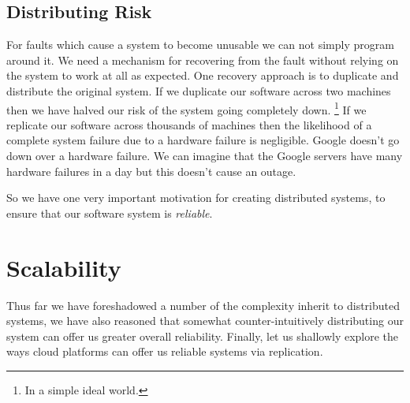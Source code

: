 \subsection{Distributing Risk}
For faults which cause a system to become unusable we can not simply program around it.
We need a mechanism for recovering from the fault without relying on the system to work at all as expected.
One recovery approach is to duplicate and distribute the original system.
If we duplicate our software across two machines then we have halved our risk of the system going completely down.%
\footnote{In a simple ideal world.}
If we replicate our software across thousands of machines then the likelihood of a complete system failure due to a hardware failure is negligible.
Google doesn't go down over a hardware failure.
We can imagine that the Google servers have many hardware failures in a day but this doesn't cause an outage.

So we have one very important motivation for creating distributed systems,
to ensure that our software system is \textsl{reliable}.




\section{Scalability}
Thus far we have foreshadowed a number of the complexity inherit to distributed systems,
we have also reasoned that somewhat counter-intuitively distributing our system can offer us greater overall reliability.
Finally, let us shallowly explore the ways cloud platforms can offer us reliable systems via replication.

